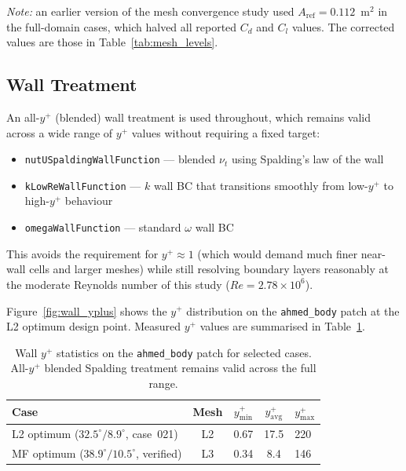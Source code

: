 \textit{Note:} an earlier version of the mesh convergence study used $A_\mathrm{ref} = 0.112$~m$^2$ in the full-domain cases, which halved all reported $C_d$ and $C_l$ values. The corrected values are those in Table~\ref{tab:mesh_levels}.

\subsection{Wall Treatment}
\label{sec:wall_treatment}

An all-$y^+$ (blended) wall treatment is used throughout, which remains valid across a wide range of $y^+$ values without requiring a fixed target:

\begin{itemize}[noitemsep]
    \item \texttt{nutUSpaldingWallFunction} — blended $\nu_t$ using Spalding's law of the wall
    \item \texttt{kLowReWallFunction} — $k$ wall BC that transitions smoothly from low-$y^+$ to high-$y^+$ behaviour
    \item \texttt{omegaWallFunction} — standard $\omega$ wall BC
\end{itemize}

This avoids the requirement for $y^+ \approx 1$ (which would demand much finer near-wall cells and larger meshes) while still resolving boundary layers reasonably at the moderate Reynolds number of this study ($Re = 2.78 \times 10^6$).

Figure~\ref{fig:wall_yplus} shows the $y^+$ distribution on the \texttt{ahmed\_body} patch at the L2 optimum design point. Measured $y^+$ values are summarised in Table~\ref{tab:yplus_summary}.

\begin{table}[h]
  \centering
  \caption{Wall $y^+$ statistics on the \texttt{ahmed\_body} patch for selected cases. All-$y^+$ blended Spalding treatment remains valid across the full range.}
  \label{tab:yplus_summary}
  \begin{tabular}{lcccl}
    \toprule
    Case & Mesh & $y^+_\mathrm{min}$ & $y^+_\mathrm{avg}$ & $y^+_\mathrm{max}$ \\
    \midrule
    L2 optimum ($32.5^\circ/8.9^\circ$, case~021) & L2 & 0.67 & 17.5 & 220 \\
    MF optimum ($38.9^\circ/10.5^\circ$, verified) & L3 & 0.34 & 8.4  & 146 \\
    \bottomrule
  \end{tabular}
\end{table}

